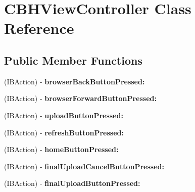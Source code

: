 \hypertarget{interface_c_b_h_view_controller}{\section{C\-B\-H\-View\-Controller Class Reference}
\label{interface_c_b_h_view_controller}
}
\subsection*{Public Member Functions}
\begin{DoxyCompactItemize}
\item 
\hypertarget{interface_c_b_h_view_controller_ac4b48111c33f274a6160f4b2ea39c6cf}{(I\-B\-Action) -\/ {\bfseries browser\-Back\-Button\-Pressed\-:}}\label{interface_c_b_h_view_controller_ac4b48111c33f274a6160f4b2ea39c6cf}

\item 
\hypertarget{interface_c_b_h_view_controller_a3725404e0a3711618b012805d877d698}{(I\-B\-Action) -\/ {\bfseries browser\-Forward\-Button\-Pressed\-:}}\label{interface_c_b_h_view_controller_a3725404e0a3711618b012805d877d698}

\item 
\hypertarget{interface_c_b_h_view_controller_a7bfb39d15e6ff5f1ea9593e79999aa56}{(I\-B\-Action) -\/ {\bfseries upload\-Button\-Pressed\-:}}\label{interface_c_b_h_view_controller_a7bfb39d15e6ff5f1ea9593e79999aa56}

\item 
\hypertarget{interface_c_b_h_view_controller_ae0ed377f106975b88087f3a18cf307ae}{(I\-B\-Action) -\/ {\bfseries refresh\-Button\-Pressed\-:}}\label{interface_c_b_h_view_controller_ae0ed377f106975b88087f3a18cf307ae}

\item 
\hypertarget{interface_c_b_h_view_controller_ae6fff149ad9ab682542ba17084cc4591}{(I\-B\-Action) -\/ {\bfseries home\-Button\-Pressed\-:}}\label{interface_c_b_h_view_controller_ae6fff149ad9ab682542ba17084cc4591}

\item 
\hypertarget{interface_c_b_h_view_controller_a7a0248ccf94716a4a8021089bef209a0}{(I\-B\-Action) -\/ {\bfseries final\-Upload\-Cancel\-Button\-Pressed\-:}}\label{interface_c_b_h_view_controller_a7a0248ccf94716a4a8021089bef209a0}

\item 
\hypertarget{interface_c_b_h_view_controller_a112c0996342c1157f8f97e35379505c9}{(I\-B\-Action) -\/ {\bfseries final\-Upload\-Button\-Pressed\-:}}\label{interface_c_b_h_view_controller_a112c0996342c1157f8f97e35379505c9}


\end{DoxyCompactItemize}
